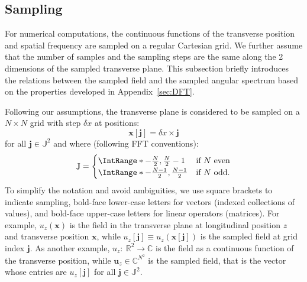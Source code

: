 \documentclass[a4paper]{article}
\newcommand{\V}[1]{\boldsymbol{#1}}
\newcommand*{\from}{{:}\:}
\newcommand*{\Set}[1]{\mathbb{#1}}
\begin{document}
\subsection{Sampling}

For numerical computations, the continuous functions of the transverse position
and spatial frequency are sampled on a regular Cartesian grid. We further
assume that the number of samples and the sampling steps are the same along the
2 dimensions of the sampled transverse plane. This subsection briefly
introduces the relations between the sampled field and the sampled angular
spectrum based on the properties developed in Appendix~\ref{sec:DFT}.

Following our assumptions, the transverse plane is considered to be sampled on
a $N\times N$ grid with step $δx$ at positions:
\begin{equation}
  \label{eq:x[j]}
  \V{x}[\V{j}] = δx\times\V{j}
\end{equation}
for all $\V{j} \in \Set{J}^{2}$ and where (following FFT conventions):
\begin{equation}
  \label{eq:J}
  \Set{J} =
  \begin{cases}
    \IntRange*{-\tfrac{N}{2},\tfrac{N}{2}-1}
    & \text{if $N$ even}\\
    \IntRange*{-\tfrac{N-1}{2},\tfrac{N-1}{2}}
    & \text{if $N$ odd.}\\
  \end{cases}
\end{equation}
To simplify the notation and avoid ambiguities, we use square brackets to
indicate sampling, bold-face lower-case letters for vectors (indexed
collections of values), and bold-face upper-case letters for linear operators
(matrices). For example, $u_{z}(\V{x})$ is the field in the transverse plane at
longitudinal position $z$ and transverse position $\V{x}$, while
$u_{z}[\V{j}] \equiv u_{z}(\V{x}[\V{j}])$ is the sampled field at grid index
$\V{j}$. As another example, $u_{z}\from\Set{R}^{2}\to\Set{C}$ is the field as
a continuous function of the transverse position, while
$\V{u}_{z} \in \Set{C}^{N^{2}}$ is the sampled field, that is the vector whose
entries are $u_{z}[\V{j}]$ for all $\V{j} \in \Set{J}^{2}$.
\end{document}
